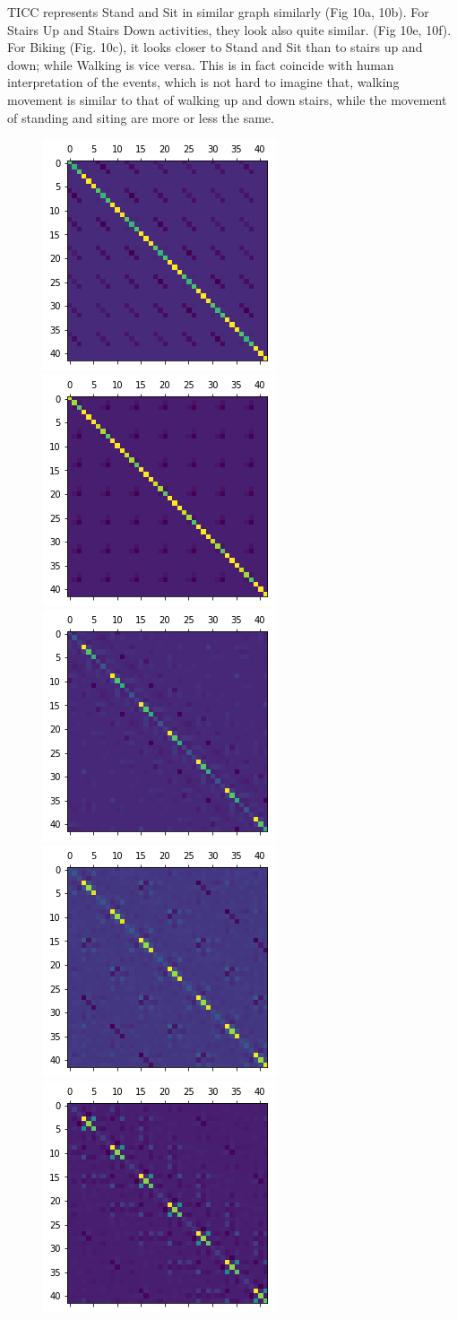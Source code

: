 \documentclass{llncs}
\begin{document}
TICC represents Stand and Sit in similar graph similarly (Fig 10a, 10b). For Stairs Up and Stairs Down activities, they look also quite similar. (Fig 10e, 10f). For Biking (Fig. 10c), it looks closer to Stand and Sit than to stairs up and down; while Walking is vice versa. This is in fact coincide with human interpretation of the events, which is not hard to imagine that, walking movement is similar to that of walking up and down stairs, while the movement of standing and siting are more or less the same.

\begin{figure}[H]
    \centering
    \includegraphics[width=.3\textwidth]{StandL.png}\hfill
    \includegraphics[width=.3\textwidth]{SitL.png}\hfill
    \includegraphics[width=.3\textwidth]{BikeL.png}
    \includegraphics[width=.3\textwidth]{WalkL.png}\hfill
    \includegraphics[width=.3\textwidth]{StairUpL.png}\hfill

\end{figure}
\end{document}
